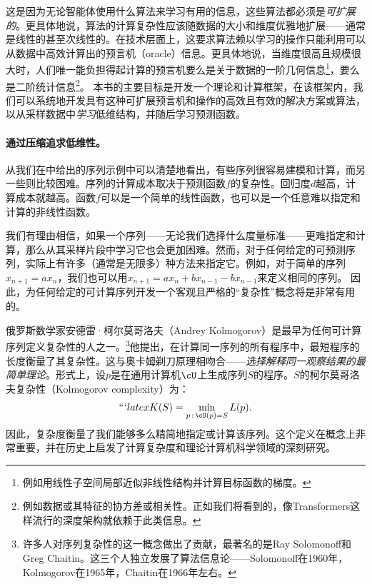 \documentclass[../../book-main_zh.tex]{subfiles}
\begin{document}
这是因为无论智能体使用什么算法来学习有用的信息，这些算法都必须是\textit{可扩展的}。更具体地说，算法的计算复杂性应该随数据的大小和维度优雅地扩展——通常是线性的甚至次线性的。在技术层面上，这要求算法赖以学习的操作只能利用可以从数据中高效计算出的预言机（oracle）信息。更具体地说，当维度很高且规模很大时，人们唯一能负担得起计算的预言机要么是关于数据的一阶几何信息\footnote{例如用线性子空间局部近似非线性结构并计算目标函数的梯度。}，要么是二阶统计信息\footnote{例如数据或其特征的协方差或相关性。正如我们将看到的，像Transformers这样流行的深度架构就依赖于此类信息。}。
本书的主要目标是开发一个理论和计算框架，在该框架内，我们可以系统地开发具有这种可扩展预言机和操作的高效且有效的解决方案或算法，以从采样数据中\textit{学习}低维结构，并随后学习预测函数。

\paragraph{通过压缩追求低维性。}
从我们在中给出的序列示例中可以清楚地看出，有些序列很容易建模和计算，而另一些则比较困难。序列的计算成本取决于预测函数\(f\)的复杂性。回归度\(d\)越高，计算成本就越高。函数\(f\)可以是一个简单的线性函数，也可以是一个任意难以指定和计算的非线性函数。

我们有理由相信，如果一个序列——无论我们选择什么度量标准——更难指定和计算，那么从其采样片段中学习它也会更加困难。然而，对于任何给定的可预测序列，实际上有许多（通常是无限多）种方法来指定它。例如，对于简单的序列\(x_{n+1}
= a x_{n}\)，我们也可以用\(x_{n+1} = a x_{n} + b x_{n-1} - b x_{n-1}\)来定义相同的序列。
因此，为任何给定的可计算序列开发一个客观且严格的“复杂性”概念将是非常有用的。

俄罗斯数学家安德雷·柯尔莫哥洛夫（Andrey
Kolmogorov）是最早为任何可计算序列定义复杂性的人之一。\footnote{许多人对序列复杂性的这一概念做出了贡献，最著名的是Ray
    Solomonoff和Greg
Chaitin。这三个人独立发展了算法信息论——Solomonoff在1960年，Kolmogorov在1965年\cite{Kolmogorov1998OnTO}，Chaitin在1966年左右\cite{Chaitin-1966}。}他提出，在计算同一序列的所有程序中，最短程序的长度衡量了其复杂性。这与奥卡姆剃刀原理相吻合——\textit{选择解释同一观察结果的最简单理论}。形式上，设\(p\)是在通用计算机\(\cU\)上生成序列\(S\)的程序。\(S\)的柯尔莫哥洛夫复杂性（Kolmogorov
complexity）为：
\begin{equation}
    ```latex
    K(S) = \min_{p\,:\, \cU(p) = S} L(p).
\end{equation}
因此，复杂度衡量了我们能够多么精简地指定或计算该序列。这个定义在概念上非常重要，并在历史上启发了计算复杂度和理论计算机科学领域的深刻研究。
\end{document}

